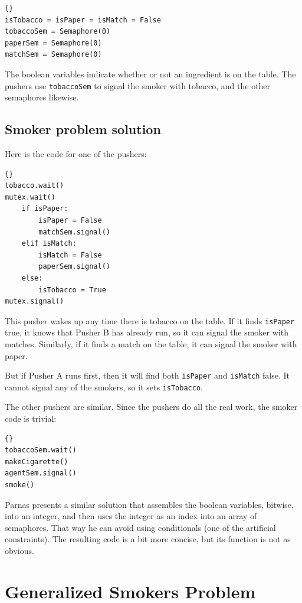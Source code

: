 \documentclass{book}
\newcommand{\clearemptydoublepage}{\newpage\cleardoublepage}
\begin{document}
\begin{lstlisting}[title={Smokers problem hint}]{}
isTobacco = isPaper = isMatch = False
tobaccoSem = Semaphore(0)
paperSem = Semaphore(0)
matchSem = Semaphore(0)
\end{lstlisting}

The boolean variables indicate whether or not an ingredient
is on the table.  The pushers use {\tt tobaccoSem} to signal
the smoker with tobacco, and the other semaphores likewise.


\clearemptydoublepage
\subsection{Smoker problem solution}

Here is the code for one of the pushers:

\begin{lstlisting}[title={Pusher A}]{}
tobacco.wait()
mutex.wait()
    if isPaper:
        isPaper = False
        matchSem.signal()
    elif isMatch:
        isMatch = False
        paperSem.signal()
    else: 
        isTobacco = True
mutex.signal()
\end{lstlisting}

This pusher wakes up any time there is tobacco on the
table.  If it finds {\tt isPaper} true, it knows that
Pusher B has already run, so it can signal the smoker
with matches.  Similarly, if it finds a match on the
table, it can signal the smoker with paper.

But if Pusher A runs first, then it will find both
{\tt isPaper} and {\tt isMatch} false.  It cannot signal
any of the smokers, so it sets {\tt isTobacco}.

The other pushers are similar.  Since the pushers do all
the real work, the smoker code is trivial:

\begin{lstlisting}[title={Smoker with tobacco}]{}
tobaccoSem.wait()
makeCigarette()
agentSem.signal()
smoke()
\end{lstlisting}

Parnas presents a similar solution that assembles the
boolean variables, bitwise, into an integer, and then
uses the integer as an index into an array of semaphores.
That way he can avoid using conditionals (one of the
artificial constraints).  The resulting code is a bit
more concise, but its function is not as obvious.


\section{Generalized Smokers Problem}
\end{document}
